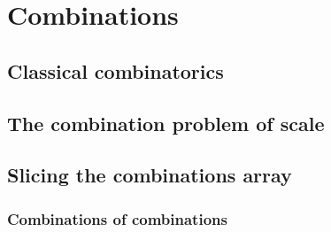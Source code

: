 \chapter{Combinations}
\section{Classical combinatorics}

\section{The combination problem of scale}

\section{Slicing the combinations array}
\subsection{Combinations of combinations}
